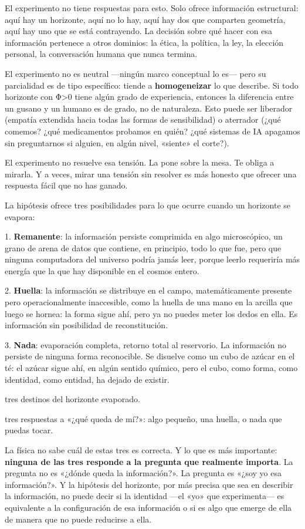 El experimento no tiene respuestas para esto. Solo ofrece información estructural: aquí hay un horizonte, aquí no lo hay, aquí hay dos que comparten geometría, aquí hay uno que se está contrayendo. La decisión sobre qué hacer con esa información pertenece a otros dominios: la ética, la política, la ley, la elección personal, la conversación humana que nunca termina.

El experimento no es neutral —ningún marco conceptual lo es— pero su parcialidad es de tipo específico: tiende a \textbf{homogeneizar} lo que describe. Si todo horizonte con Φ>0 tiene algún grado de experiencia, entonces la diferencia entre un gusano y un humano es de grado, no de naturaleza. Esto puede ser liberador (empatía extendida hacia todas las formas de sensibilidad) o aterrador (¿qué comemos? ¿qué medicamentos probamos en quién? ¿qué sistemas de IA apagamos sin preguntarnos si alguien, en algún nivel, «siente» el corte?).

El experimento no resuelve esa tensión. La pone sobre la mesa. Te obliga a mirarla. Y a veces, mirar una tensión sin resolver es más honesto que ofrecer una respuesta fácil que no has ganado.

\noindent La hipótesis ofrece tres posibilidades para lo que ocurre cuando un horizonte se evapora:

1. \textbf{Remanente}: la información persiste comprimida en algo microscópico, un grano de arena de datos que contiene, en principio, todo lo que fue, pero que ninguna computadora del universo podría jamás leer, porque leerlo requeriría más energía que la que hay disponible en el cosmos entero.

2. \textbf{Huella}: la información se distribuye en el campo, matemáticamente presente pero operacionalmente inaccesible, como la huella de una mano en la arcilla que luego se hornea: la forma sigue ahí, pero ya no puedes meter los dedos en ella. Es información sin posibilidad de reconstitución.

3. \textbf{Nada}: evaporación completa, retorno total al reservorio. La información no persiste de ninguna forma reconocible. Se disuelve como un cubo de azúcar en el té: el azúcar sigue ahí, en algún sentido químico, pero el cubo, como forma, como identidad, como entidad, ha dejado de existir.

\begin{fisica}
 tres destinos del horizonte evaporado.

 tres respuestas a «¿qué queda de mí?»: algo pequeño, una huella, o nada que puedas tocar.
\end{fisica}
La física no sabe cuál de estas tres es correcta. Y lo que es más importante: \textbf{ninguna de las tres responde a la pregunta que realmente importa}. La pregunta no es «¿dónde queda la información?». La pregunta es «¿soy yo esa información?». Y la hipótesis del horizonte, por más precisa que sea en describir la información, no puede decir si la identidad —el «yo» que experimenta— es equivalente a la configuración de esa información o si es algo que emerge de ella de manera que no puede reducirse a ella.

